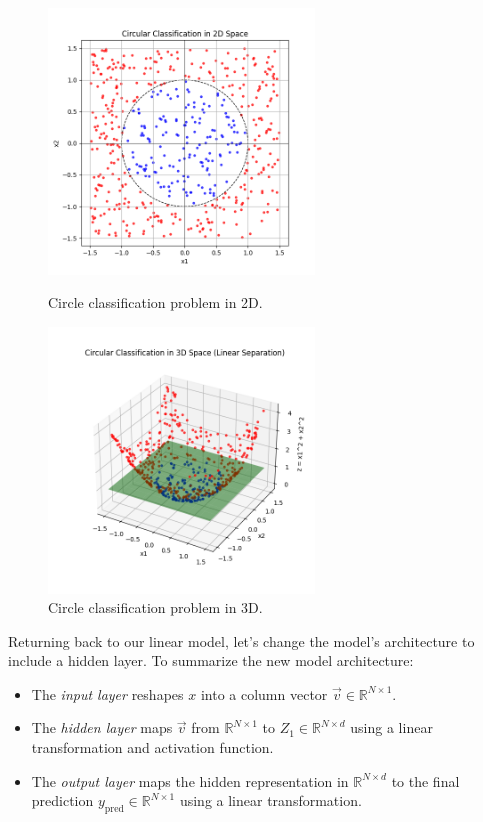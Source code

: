 \begin{figure}[H]
\centering
\begin{minipage}{.5\textwidth}
  \centering
  \includegraphics[width=200pt]{Regression/code/circular-data.png}
  \caption{Circle classification problem in 2D.}
  \label{fig:linear7}
\end{minipage}%
\begin{minipage}{.5\textwidth}
  \centering
  \includegraphics[width=200pt]{Regression/code/circular-data-3d.png}
  \caption{Circle classification problem in 3D.}
  \label{fig:linear8}
\end{minipage}
\end{figure}

Returning back to our linear model, let's change the model's architecture to include a hidden layer. To summarize the new model architecture:
\begin{itemize}
    \item The \textit{input layer} reshapes $x$ into a column vector $\vec{v}\in \mathbb{R}^{N\times 1}$.
    \item The \textit{hidden layer} maps $\vec{v}$ from $\mathbb{R}^{N\times 1}$ to $Z_1\in\mathbb{R}^{N\times d}$ using a linear transformation and activation function.
    \item The \textit{output layer} maps the hidden representation in $\mathbb{R}^{N\times d}$ to the final prediction $y_{\text{pred}}\in\mathbb{R}^{N\times 1}$ using a linear transformation.
\end{itemize}

